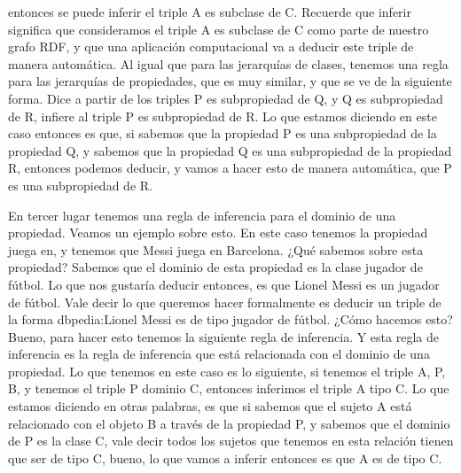entonces se puede inferir el triple A es subclase de C. Recuerde que inferir significa que consideramos el triple A es subclase de C como parte de nuestro grafo RDF, y que una aplicación computacional va a deducir este triple de manera automática. Al igual que para las jerarquías de clases, tenemos una regla para las jerarquías de propiedades, que es muy similar, y que se ve de la siguiente forma. Dice a partir de los triples P es subpropiedad de Q, y Q es subpropiedad de R, infiere al triple P es subpropiedad de R. Lo que estamos diciendo en este caso entonces es que, si sabemos que la propiedad P es una subpropiedad de la propiedad Q, y sabemos que la propiedad Q es una subpropiedad de la propiedad R, entonces podemos deducir, y vamos a hacer esto de manera automática, que P es una subpropiedad de R.

En tercer lugar tenemos una regla de inferencia para el dominio de una propiedad. Veamos un ejemplo sobre esto. En este caso tenemos la propiedad juega en, y tenemos que Messi juega en Barcelona. ¿Qué sabemos sobre esta propiedad? Sabemos que el dominio de esta propiedad es la clase jugador de fútbol. Lo que nos gustaría deducir entonces, es que Lionel Messi es un jugador de fútbol. Vale decir lo que queremos hacer formalmente es deducir un triple de la forma dbpedia:Lionel Messi es de tipo jugador de fútbol. ¿Cómo hacemos esto? Bueno, para hacer esto tenemos la siguiente regla de inferencia. Y esta regla de inferencia es la regla de inferencia que está relacionada con el dominio de una propiedad. Lo que tenemos en este caso es lo siguiente, si tenemos el triple A, P, B, y tenemos el triple P dominio C, entonces inferimos el triple A tipo C. Lo que estamos diciendo en otras palabras, es que si sabemos que el sujeto A está relacionado con el objeto B a través de la propiedad P, y sabemos que el dominio de P es la clase C, vale decir todos los sujetos que tenemos en esta relación tienen que ser de tipo C, bueno, lo que vamos a inferir entonces es que A es de tipo C.

